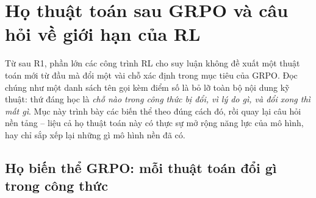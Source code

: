 
\section{Họ thuật toán sau GRPO và câu hỏi về giới hạn của RL}
\label{sec:rl_algorithms}

Từ sau R1, phần lớn các công trình RL cho suy luận không đề xuất một thuật toán mới từ đầu mà đổi một vài chỗ xác định trong mục tiêu của GRPO. Đọc chúng như một danh sách tên gọi kèm điểm số là bỏ lỡ toàn bộ nội dung kỹ thuật: thứ đáng học là \emph{chỗ nào trong công thức bị đổi, vì lý do gì, và đổi xong thì mất gì}. Mục này trình bày các biến thể theo đúng cách đó, rồi quay lại câu hỏi nền tảng -- liệu cả họ thuật toán này có thực sự mở rộng năng lực của mô hình, hay chỉ sắp xếp lại những gì mô hình nền đã có.

\subsection{Họ biến thể GRPO: mỗi thuật toán đổi gì trong công thức}
\label{ssec:grpo_variants}

